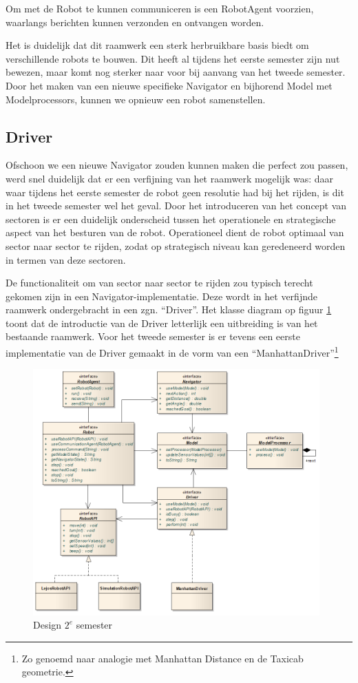 \documentclass[12pt,a4paper]{report}
\begin{document}
Om met de Robot te kunnen communiceren is een RobotAgent voorzien, waarlangs berichten kunnen verzonden en ontvangen worden.

Het is duidelijk dat dit raamwerk een sterk herbruikbare basis biedt om verschillende robots te bouwen. Dit heeft al tijdens het eerste semester zijn nut bewezen, maar komt nog sterker naar voor bij aanvang van het tweede semester. Door het maken van een nieuwe specifieke Navigator en bijhorend Model met Modelprocessors, kunnen we opnieuw een robot samenstellen.

\subsection{Driver}

Ofschoon we een nieuwe Navigator zouden kunnen maken die perfect zou passen, werd snel duidelijk dat er een verfijning van het raamwerk mogelijk was: daar waar tijdens het eerste semester de robot geen resolutie had bij het rijden, is dit in het tweede semester wel het geval. Door het introduceren van het concept van sectoren is er een duidelijk onderscheid tussen het operationele en strategische aspect van het besturen van de robot. Operationeel dient de robot optimaal van sector naar sector te rijden, zodat op strategisch niveau kan geredeneerd worden in termen van deze sectoren.

De functionaliteit om van sector naar sector te rijden zou typisch terecht gekomen zijn in een Navigator-implementatie. Deze wordt in het verfijnde raamwerk ondergebracht in een zgn. ``Driver''. Het klasse diagram op figuur \ref{uml:design-semster2} toont dat de introductie van de Driver letterlijk een uitbreiding is van het bestaande raamwerk. Voor het tweede semester is er tevens een eerste implementatie van de Driver gemaakt in de vorm van een ``ManhattanDriver''\footnote{Zo genoemd naar analogie met Manhattan Distance en de Taxicab geometrie.} 

\begin{figure}[htbp]
  \centering
  \includegraphics[width=110mm]{resources/design-semester2.png}
  \caption{Design $2^e$ semester}
  \label{uml:design-semster2}
\end{figure}
\end{document}
